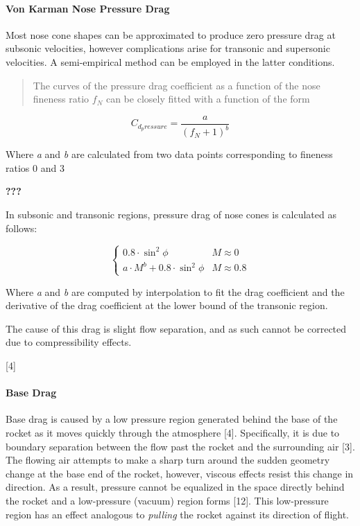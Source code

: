 \documentclass[]{article}
\let\oldparagraph\paragraph
\renewcommand{\paragraph}[1]{\oldparagraph{#1}\mbox{}}
\begin{document}
\paragraph{Von Karman Nose Pressure
Drag}\label{von-karman-nose-pressure-drag}

Most nose cone shapes can be approximated to produce zero pressure drag
at subsonic velocities, however complications arise for transonic and
supersonic velocities. A semi-empirical method can be employed in the
latter conditions.

\begin{quote}
The curves of the pressure drag coefficient as a function of the nose
fineness ratio \(f_N\) can be closely fitted with a function of the form
\end{quote}

\begin{equation}
C_{d_pressure} = \dfrac{a}{(f_N + 1)^b}
\end{equation}

Where \emph{a} and \emph{b} are calculated from two data points
corresponding to fineness ratios 0 and 3

{\textbf{???}}

In subsonic and transonic regions, pressure drag of nose cones is
calculated as follows:

\begin{equation}
\begin{cases}
    0.8 \cdot \sin^2 \phi               & M \approx 0 \\
    a \cdot M^b + 0.8 \cdot \sin^2 \phi & M \approx 0.8
\end{cases}
\end{equation}

Where \emph{a} and \emph{b} are computed by interpolation to fit the
drag coefficient and the derivative of the drag coefficient at the lower
bound of the transonic region.

The cause of this drag is slight flow separation, and as such cannot be
corrected due to compressibility effects.

{[}4{]}

\paragraph{Base Drag}\label{base-drag}

Base drag is caused by a low pressure region generated behind the base
of the rocket as it moves quickly through the atmosphere {[}4{]}.
Specifically, it is due to boundary separation between the flow past the
rocket and the surrounding air {[}3{]}. The flowing air attempts to make
a sharp turn around the sudden geometry change at the base end of the
rocket, however, viscous effects resist this change in direction. As a
result, pressure cannot be equalized in the space directly behind the
rocket and a low-pressure (vacuum) region forms {[}12{]}. This
low-pressure region has an effect analogous to \emph{pulling} the rocket
against its direction of flight.
\end{document}
